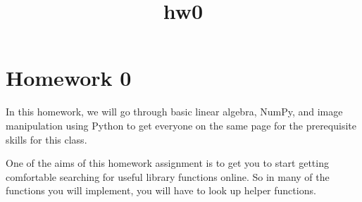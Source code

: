 \documentclass[11pt]{article}
\title{hw0}
\begin{document}
    
    \maketitle
    
    

    
    \hypertarget{homework-0}{%
\section{Homework 0}\label{homework-0}}

In this homework, we will go through basic linear algebra, NumPy, and
image manipulation using Python to get everyone on the same page for the
prerequisite skills for this class.

One of the aims of this homework assignment is to get you to start
getting comfortable searching for useful library functions online. So in
many of the functions you will implement, you will have to look up
helper functions.
\end{document}
